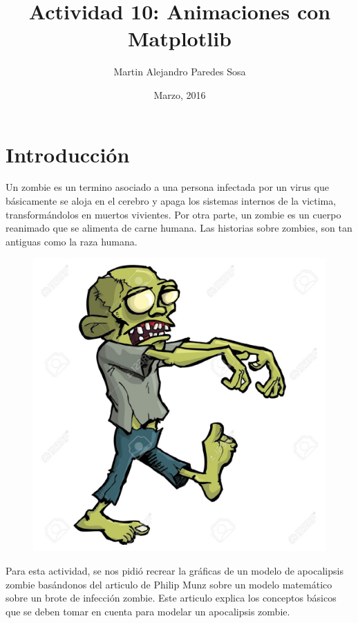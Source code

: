 \documentclass[12pt]{article}
\title{Actividad 10: Animaciones con Matplotlib}
\author{Martin Alejandro Paredes Sosa}
\date{Marzo, 2016}
\begin{document}
\maketitle

\section{Introducción}
\noindent
Un zombie\cite{Wiki} es un termino asociado a una persona infectada por un virus que básicamente se aloja en el cerebro y apaga los sistemas internos de la victima, transformándolos en muertos vivientes. Por otra parte, un zombie es un cuerpo reanimado que se alimenta de carne humana. Las historias sobre zombies, son tan antiguas como la raza humana. 

\begin{figure}[H]
\centering
\includegraphics[scale=0.25]{zom.jpg}
\end{figure}

Para esta actividad, se nos pidió recrear la gráficas de un modelo de apocalipsis zombie basándonos del articulo de Philip Munz\cite{Manual} sobre un modelo matemático sobre un brote de infección zombie. Este articulo explica los conceptos básicos que se deben tomar en cuenta para modelar un apocalipsis zombie.

\pagebreak
\end{document}
